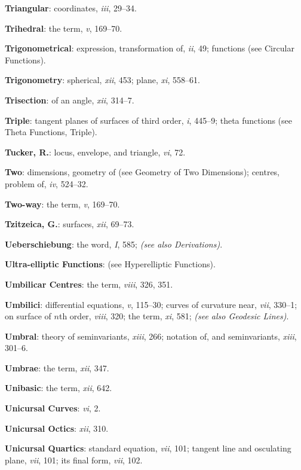 \documentclass[11pt,a4paper]{article}
\newcommand{\IndexEntry}[1]{\textbf{#1}}
\newcommand{\SeeAlso}[1]{\textit{(see also #1)}}
\newcommand{\V}[1]{\textit{#1}} %
\begin{document}
\IndexEntry{Triangular}: coordinates, \V{iii}, 29--34.

\IndexEntry{Trihedral}: the term, \V{v}, 169--70.

\IndexEntry{Trigonometrical}: expression, transformation of, \V{ii}, 49; functions (see Circular Functions).

\IndexEntry{Trigonometry}: spherical, \V{xii}, 453; plane, \V{xi}, 558--61.

\IndexEntry{Trisection}: of an angle, \V{xii}, 314--7.

\IndexEntry{Triple}: tangent planes of surfaces of third order, \V{i}, 445--9; theta functions (see Theta Functions, Triple).

\IndexEntry{Tucker, R.}: locus, envelope, and triangle, \V{vi}, 72.

\IndexEntry{Two}: dimensions, geometry of (see Geometry of Two Dimensions); centres, problem of, \V{iv}, 524--32.

\IndexEntry{Two-way}: the term, \V{v}, 169--70.

\newpage

\setcounter{page}{130}

\IndexEntry{Tzitzeica, G.}: surfaces, \V{xii}, 69--73.

\IndexEntry{Ueberschiebung}: the word, \V{I}, 585; \SeeAlso{Derivations}.

\IndexEntry{Ultra-elliptic Functions}: (see Hyperelliptic Functions).

\IndexEntry{Umbilicar Centres}: the term, \V{viii}, 326, 351.

\IndexEntry{Umbilici}: differential equations, \V{v}, 115--30; curves of curvature near, \V{vii}, 330--1; on surface of $n$th order, \V{viii}, 320; the term, \V{xi}, 581; \SeeAlso{Geodesic Lines}.

\IndexEntry{Umbral}: theory of seminvariants, \V{xiii}, 266; notation of, and seminvariants, \V{xiii}, 301--6.

\IndexEntry{Umbrae}: the term, \V{xii}, 347.

\IndexEntry{Unibasic}: the term, \V{xii}, 642.

\IndexEntry{Unicursal Curves}: \V{vi}, 2.

\IndexEntry{Unicursal Octics}: \V{xii}, 310.

\IndexEntry{Unicursal Quartics}: standard equation, \V{vii}, 101; tangent line and osculating plane, \V{vii}, 101; its final form, \V{vii}, 102.
\end{document}
